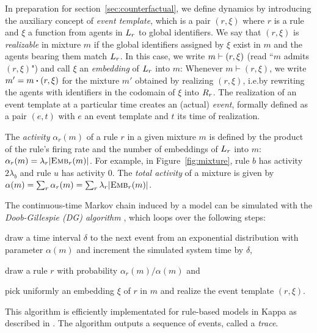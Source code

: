 

In preparation for section~\ref{sec:counterfactual}, we define
dynamics by introducing the auxiliary concept of \emph{event
  template}, which is a pair $(r, \xi)$ where $r$ is a rule and $\xi$
a function from agents in $L_{r}$ to global identifiers. We say
that $(r, \xi)$ is \emph{realizable} in mixture $m$ if the global
identifiers assigned by $\xi$ exist in $m$ and the agents bearing them
match $L_{r}$. In this case, we write $m \vdash (r, \xi)$
(read ``$m$ admits $(r, \xi)$") and call $\xi$ an \emph{embedding} of
$L_{r}$ into $m$:
  Whenever $m \vdash (r, \xi)$, we write
$m'=\UPDATE{m}{(r, \xi)}$ for the mixture $m'$ obtained by realizing
$(r, \xi)$, i.e.\@ by rewriting the agents with identifiers in the
codomain of $\xi$ into $R_{r}$. The realization of an event
template at a particular time creates an (actual) \emph{event},
formally defined as a pair $(e, t)$ with $e$ an event template and $t$
its time of realization.

The \emph{activity} $\alpha_r(m)$ of a rule $r$ in a given mixture $m$
is defined by the product of the rule's firing rate and the number of
embeddings of $L_{r}$ into $m$:
$\alpha_r(m)=\lambda_r|{\textsc{Emb}}_{r}(m)|$. For example, in
Figure~\ref{fig:mixture}, rule $b$ has activity $2\lambda_b$ and rule
$u$ has activity $0$. The \emph{total activity} of a mixture is given
by $\alpha(m)=\sum_r\alpha_r(m)=\sum_r\lambda_r|{\textsc{Emb}}_{r}(m)|$.

The continuous-time Markov chain induced by a model can be simulated
with the \emph{Doob-Gillespie (DG) algorithm}
\cite{gillespie1977exact}, which loops over the following steps:
\begin{inparaenum}[(1)]
\item draw a time interval $\delta$ to the next event from an
  exponential distribution with parameter $\alpha(m)$ and increment
  the simulated system time by $\delta$,
\item draw a rule $r$ with probability $\alpha_r(m)/\alpha(m)$ and
\item pick uniformly an embedding $\xi$ of $r$ in $m$ and realize the
  event template $(r, \xi)$.
\end{inparaenum}
This algorithm is efficiently implementated for rule-based models in
Kappa as described in
\cite{DanosEtAl-APLAS07,BoutillierEK17}. The algorithm outputs a sequence of events,
called a \emph{trace}.

